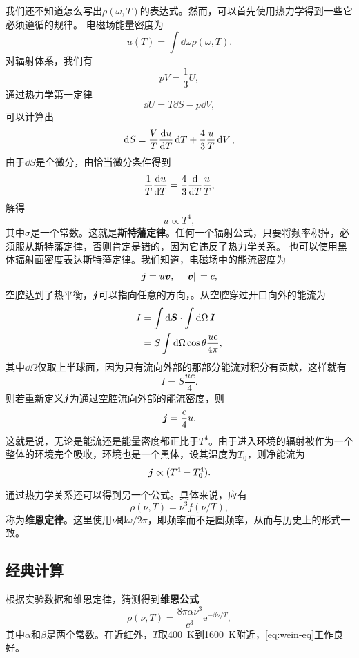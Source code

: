 \documentclass[UTF8, a4paper]{ctexart}
\newcommand*{\ee}{\mathrm{e}}
\begin{document}
我们还不知道怎么写出$\rho(\omega, T)$的表达式。然而，可以首先使用热力学得到一些它必须遵循的规律。
电磁场能量密度为
\[
    u(T) = \int \dd{\omega} \rho(\omega, T).
\]
对辐射体系，我们有
\begin{equation}
    pV = \frac{1}{3} U,
\end{equation}
通过热力学第一定律
\[
    \dd{U} = T \dd{S} - p \dd{V},
\]
可以计算出
\[
    \dd{S} = \frac{V}{T} \dv{u}{T} \dd{T} + \frac{4}{3} \frac{u}{T} \dd{V},
\]
由于$\dd{S}$是全微分，由恰当微分条件得到
\[
    \frac{1}{T} \dv{u}{T} = \frac{4}{3} \dv{T} \frac{u}{T},
\]
解得
\begin{equation}
    u \propto T^4,
\end{equation}
其中$\sigma$是一个常数。这就是\textbf{斯特藩定律}。任何一个辐射公式，只要将频率积掉，必须服从斯特藩定律，否则肯定是错的，因为它违反了热力学关系。
也可以使用黑体辐射面密度表达斯特藩定律。我们知道，电磁场中的能流密度为
\[
    \vb*{j} = u \vb*{v}, \quad \abs*{\vb*{v}} = c, 
\]
空腔达到了热平衡，$\vb*{j}$可以指向任意的方向，。从空腔穿过开口向外的能流为%
\[
    \begin{aligned}
        I &= \int \dd{\vb*{S}} \cdot \int \dd{\Omega} \vb*{I} \\
        &= S \int \dd{\Omega} \cos \theta \frac{u c}{4 \pi},
    \end{aligned}
\]
其中$\dd{\Omega}$仅取上半球面，因为只有流向外部的那部分能流对积分有贡献，这样就有
\[
    I = S \frac{u c}{4}.
\]
则若重新定义$\vb*{j}$为通过空腔流向外部的能流密度，则
\begin{equation}
    \vb*{j} = \frac{c}{4} u.
\end{equation}
这就是说，无论是能流还是能量密度都正比于$T^4$。由于进入环境的辐射被作为一个整体的环境完全吸收，环境也是一个黑体，设其温度为$T_0$，则净能流为
\begin{equation}
    \vb*{j} \propto (T^4-T_0^4).
\end{equation}

通过热力学关系还可以得到另一个公式。具体来说，应有
\begin{equation}
    \rho(\nu, T) = \nu^3 f(\nu / T),
\end{equation}
称为\textbf{维恩定律}。这里使用$\nu$即$\omega/2\pi$，即频率而不是圆频率，从而与历史上的形式一致。

\subsection{经典计算}

根据实验数据和维恩定律，猜测得到\textbf{维恩公式}
\begin{equation}
    \rho(\nu, T) = \frac{8\pi \alpha \nu^3}{c^3} \ee^{- \beta \nu / T},
    \label{eq:wein-eq}
\end{equation}
其中$\alpha$和$\beta$是两个常数。在近红外，$T$取\SI{400}{K}到\SI{1600}{K}附近，\eqref{eq:wein-eq}工作良好。
\end{document}
